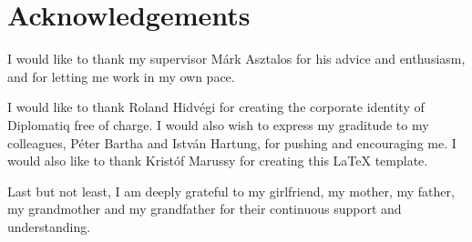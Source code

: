 \chapter*{Acknowledgements}
{}
\thispagestyle{plain}

I would like to thank my supervisor Márk Asztalos for his advice and enthusiasm, and for letting me work in my own pace.

I would like to thank Roland Hidvégi for creating the corporate identity of Diplomatiq free of charge. I would also wish to express my graditude to my colleagues, Péter Bartha and István Hartung, for pushing and encouraging me. I would also like to thank Kristóf Marussy for creating this \LaTeX\xspace template.

Last but not least, I am deeply grateful to my girlfriend, my mother, my father, my grandmother and my grandfather for their continuous support and understanding.

